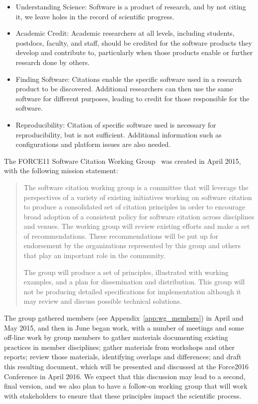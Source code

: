 \documentclass[11pt, oneside]{amsart}
\begin{document}
\begin{itemize}
\item Understanding Science: Software is a product of research, and by not citing it, we leave holes in the record of scientific progress.
\item Academic Credit: Academic researchers at all levels, including students, postdocs, faculty, and staff, should be
credited for the software products they develop and contribute to, particularly when those products enable or further research done by others.
\item Finding Software: Citations enable the specific software used in a research product to be discovered. Additional researchers can then use the same software for different purposes, leading
to credit for those responsible for the software.
\item Reproducibility: Citation of specific software used is necessary for reproducibility, but is not sufficient.  Additional information such as configurations and platform issues are also needed.
\end{itemize}


The FORCE11 Software Citation Working Group~\cite{f11scwg} was created in April 2015, with the following mission statement:

\begin{quote}
The software citation working group is a committee that will leverage the perspectives of a variety of existing initiatives working on software citation to produce a consolidated set of citation principles in order to encourage broad adoption of a consistent policy for software citation across disciplines and venues. The working group will review existing efforts and make a set of recommendations. These recommendations will be put up for endorsement by the organizations represented by this group and others that play an important role in the community.

The group will produce a set of principles, illustrated with working examples, and a plan for dissemination and distribution. This group will not be producing detailed specifications for implementation although it may review and discuss possible technical solutions.\end{quote}

The group gathered members (see Appendix~\ref{app:wg_members}) in April and May 2015,
and then in June began work, with a number of meetings
and some off-line work by group members to gather materials documenting existing
practices in member disciplines; gather materials from workshops and other reports;
review those materials, identifying overlaps and differences; and draft this resulting document,
which will be presented and discussed at the Force2016 Conference \cite{force2016}
in April 2016.  We expect that
this discussion may lead to a second, final version, and we also
plan to have a follow-on working group that will work with stakeholders to ensure that
these principles impact the scientific process.
\end{document}
